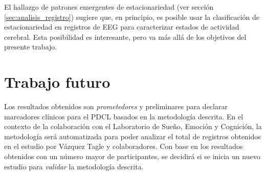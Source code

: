 \documentclass[12pt,letterpaper]{book}
\begin{document}

El hallazgo de patrones emergentes de estacionariedad (ver sección \ref{sec:analisis_registro}) sugiere que, en principio, es posible usar la clasificación de estacionariedad en registros de EEG para caracterizar estados de actividad cerebral. 
%
Esta posibilidad es interesante, pero va más allá de los objetivos del presente trabajo.
 


\section{Trabajo futuro}

Los resultados obtenidos son \textit{prometedores} y preliminares para declarar marcadores clínicos para el PDCL basados en la metodología descrita.
%
En el contexto de la colaboración con el Laboratorio de Sueño, Emoción y Cognición, la metodología será automatizada para poder analizar el total de registros obtenidos en el estudio por Vázquez Tagle y colaboradores.
%
Con base en los resultados obtenidos con un número mayor de participantes, se decidirá si se inicia un nuevo estudio para \textit{validar} la metodología descrita.

%
%
\end{document}
